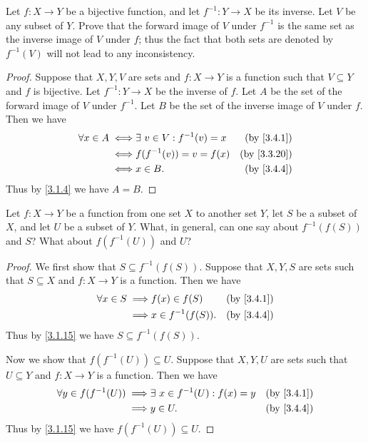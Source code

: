 \exercisesection

\begin{ex}\label{ex:3.4.1}
  Let \(f : X \to Y\) be a bijective function, and let \(f^{-1} : Y \to X\) be its inverse.
  Let \(V\) be any subset of \(Y\).
  Prove that the forward image of \(V\) under \(f^{-1}\) is the same set as the inverse image of \(V\) under \(f\);
  thus the fact that both sets are denoted by \(f^{-1}(V)\) will not lead to any inconsistency.
\end{ex}

\begin{proof}
  Suppose that \(X, Y, V\) are sets and \(f : X \to Y\) is a function such that \(V \subseteq Y\) and \(f\) is bijective.
  Let \(f^{-1} : Y \to X\) be the inverse of \(f\).
  Let \(A\) be the set of the forward image of \(V\) under \(f^{-1}\).
  Let \(B\) be the set of the inverse image of \(V\) under \(f\).
  Then we have
  \begin{align*}
    \forall x \in A \iff & \exists\ v \in V : f^{-1}(v) = x & \text{(by \cref{3.4.1})}  \\
    \iff                 & f(f^{-1}(v)) = v = f(x)          & \text{(by \cref{3.3.20})} \\
    \iff                 & x \in B.                         & \text{(by \cref{3.4.4})}
  \end{align*}
  Thus by \cref{3.1.4} we have \(A = B\).
\end{proof}

\begin{ex}\label{ex:3.4.2}
  Let \(f : X \to Y\) be a function from one set \(X\) to another set \(Y\), let \(S\) be a subset of \(X\), and let \(U\) be a subset of \(Y\).
  What, in general, can one say about \(f^{-1}(f(S))\) and \(S\)?
  What about \(f(f^{-1}(U))\) and \(U\)?
\end{ex}

\begin{proof}
  We first show that \(S \subseteq f^{-1}(f(S))\).
  Suppose that \(X, Y, S\) are sets such that \(S \subseteq X\) and \(f : X \to Y\) is a function.
  Then we have
  \begin{align*}
    \forall x \in S \implies & f(x) \in f(S)       & \text{(by \cref{3.4.1})} \\
    \implies                 & x \in f^{-1}(f(S)). & \text{(by \cref{3.4.4})}
  \end{align*}
  Thus by \cref{3.1.15} we have \(S \subseteq f^{-1}(f(S))\).

  Now we show that \(f(f^{-1}(U)) \subseteq U\).
  Suppose that \(X, Y, U\) are sets such that \(U \subseteq Y\) and \(f : X \to Y\) is a function.
  Then we have
  \begin{align*}
    \forall y \in f(f^{-1}(U)) \implies & \exists\ x \in f^{-1}(U) : f(x) = y & \text{(by \cref{3.4.1})} \\
    \implies                            & y \in U.                            & \text{(by \cref{3.4.4})}
  \end{align*}
  Thus by \cref{3.1.15} we have \(f(f^{-1}(U)) \subseteq U\).
\end{proof}

